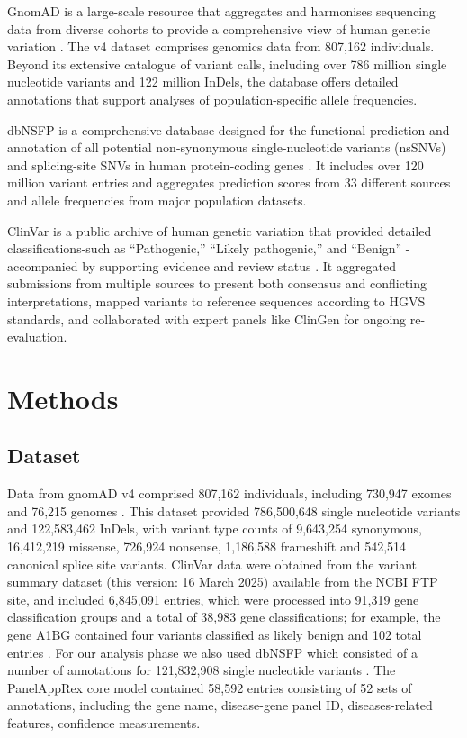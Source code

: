 GnomAD is a large-scale resource that aggregates and harmonises sequencing data from diverse cohorts to provide a comprehensive view of human genetic variation \cite{karczewski2020mutational}. The v4 dataset comprises genomics data from 807,162 individuals.
Beyond its extensive catalogue of variant calls, including over 786 million single nucleotide variants and 122 million InDels, the database offers detailed annotations that support analyses of population-specific allele frequencies.

dbNSFP is a comprehensive database designed for the functional prediction and annotation of all potential non-synonymous single-nucleotide variants (nsSNVs) and splicing-site SNVs in human protein-coding genes \cite{liu_dbnsfp_2020}. It includes over 120 million variant entries and aggregates prediction scores from 33 different sources and allele frequencies from major population datasets.

ClinVar is a public archive of human genetic variation that provided detailed classifications-such as ``Pathogenic,'' ``Likely pathogenic,'' and ``Benign'' -accompanied by supporting evidence and review status \cite{landrum_clinvar_2018}. It aggregated submissions from multiple sources to present both consensus and conflicting interpretations, mapped variants to reference sequences according to HGVS standards, and collaborated with expert panels like ClinGen for ongoing re-evaluation.

\section{Methods}
\subsection{Dataset}

Data from gnomAD v4 comprised 807,162 individuals, including 730,947 exomes and 76,215 genomes \cite{karczewski2020mutational}. This dataset provided 786,500,648 single nucleotide variants and 122,583,462 InDels, with variant type counts of 9,643,254 synonymous, 16,412,219 missense, 726,924 nonsense, 1,186,588 frameshift and 542,514 canonical splice site variants. ClinVar data were obtained from the variant summary dataset (this version: 16 March 2025) available from the NCBI FTP site, and included 6,845,091 entries, which were processed into 91,319 gene classification groups and a total of 38,983 gene classifications; for example, the gene A1BG contained four variants classified as likely benign and 102 total entries \cite{landrum_clinvar_2018}. For our analysis phase we also used dbNSFP which consisted of a number of annotations for 121,832,908 single nucleotide variants 
\cite{liu_dbnsfp_2020}. 
The PanelAppRex core model contained 58,592 entries consisting of 52 sets of annotations, including the gene name, disease-gene panel ID, diseases-related features, confidence measurements.
\cite{lawless_panelapprex_2025}


